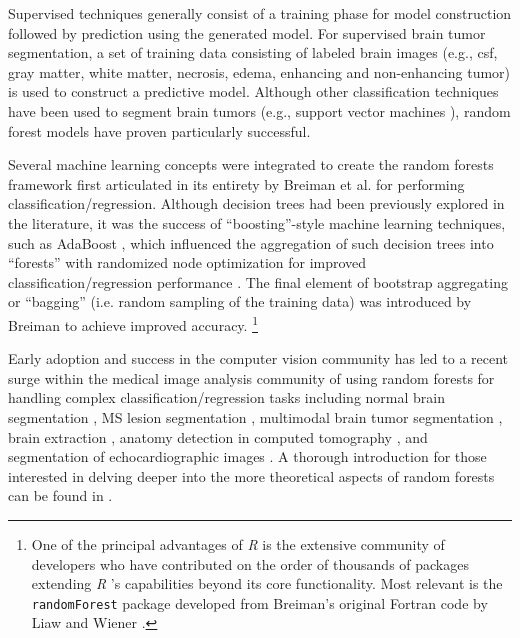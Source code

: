 \documentclass[final,5p,times,twocolumn]{elsarticle}
\begin{document}
Supervised techniques generally consist of a training phase
for model construction followed by prediction using the 
generated model.  For supervised brain tumor segmentation, 
a set of training data consisting of labeled brain images 
(e.g., csf, gray matter, white matter, 
necrosis, edema, enhancing and  non-enhancing tumor) is
used to construct a predictive model.  Although other 
classification techniques have been used to segment
brain tumors (e.g., support vector machines \citep{bauer2011}),
random forest models have proven particularly successful.

Several machine learning concepts were integrated to create 
the random forests framework first articulated in its entirety by Breiman
et al. \cite{breiman2001} for performing classification/regression.  
Although decision trees had been previously explored in the literature, 
it was the success of ``boosting''-style machine learning 
techniques, such as AdaBoost \cite{schapire1990,freund1997}, which influenced 
the aggregation of such decision trees into ``forests'' 
with randomized node optimization for improved
classification/regression performance \cite{ho1995,amit1997}.
The final element of bootstrap aggregating or ``bagging'' (i.e.
random sampling of the training data) was
introduced by Breiman \cite{breiman1996} to achieve improved
accuracy.%
\footnote{
One of the principal advantages of \textit{R} is the extensive community of
developers  who have contributed on the order of thousands of packages 
extending \textit{R} 's capabilities beyond its core functionality.
Most relevant 
is the {\tt randomForest} package developed from Breiman's original
Fortran code by Liaw and Wiener \citep{liaw2002}.
}

Early adoption \cite{viola2005} and success in the
computer vision community
has led to a recent surge within the medical image analysis
community of using random forests for handling complex 
classification/regression tasks including
normal brain segmentation \cite{yi2009},
MS lesion segmentation \cite{geremia2011}, 
multimodal brain tumor segmentation
\cite{bauer2012,zikic2012}, brain extraction \cite{iglesias2010}, 
anatomy detection in computed tomography \cite{criminisi2013}, and
segmentation of echocardiographic images \cite{verhoek2011}. 
A thorough introduction for those interested in delving deeper 
into the more theoretical aspects of random forests can be found
in \cite{criminisi2011}.

\end{document}
